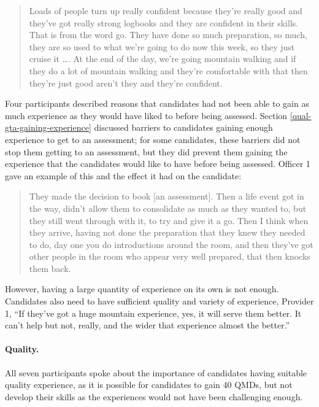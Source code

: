 \documentclass[
  12pt,
  a4paper,
]{book}
\begin{document}
\begin{quote}
Loads of people turn up really confident because they're really good and they've got really strong logbooks and they are confident in their skills. That is from the word go. They have done so much preparation, so much, they are so used to what we're going to do now this week, so they just cruise it \ldots. At the end of the day, we're going mountain walking and if they do a lot of mountain walking and they're comfortable with that then they're just good aren't they and they're confident.
\end{quote}

Four participants described reasons that candidates had not been able to gain as much experience as they would have liked to before being assessed. Section \ref{qual-gta-gaining-experience} discussed barriers to candidates gaining enough experience to get to an assessment; for some candidates, these barriers did not stop them getting to an assessment, but they did prevent them gaining the experience that the candidates would like to have before being assessed. Officer 1 gave an example of this and the effect it had on the candidate:

\begin{quote}
They made the decision to book {[}an assessment{]}. Then a life event got in the way, didn't allow them to consolidate as much as they wanted to, but they still went through with it, to try and give it a go. Then I think when they arrive, having not done the preparation that they knew they needed to do, day one you do introductions around the room, and then they've got other people in the room who appear very well prepared, that then knocks them back.
\end{quote}

However, having a large quantity of experience on its own is not enough. Candidates also need to have sufficient quality and variety of experience, Provider 1, ``If they've got a huge mountain experience, yes, it will serve them better. It can't help but not, really, and the wider that experience almost the better.''

\hypertarget{quality.}{%
\paragraph{Quality.}\label{quality.}}

All seven participants spoke about the importance of candidates having suitable quality experience, as it is possible for candidates to gain 40 QMDs, but not develop their skills as the experiences would not have been challenging enough.
\end{document}
